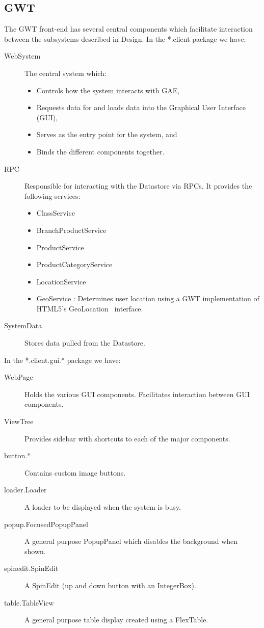 \subsection{GWT}
The GWT front-end has several central components which facilitate interaction between the subsystems described in Design.
In the *.client package we have:
\begin{description}
\item[WebSystem] The central system which:\begin{itemize}
\item Controls how the system interacts with GAE,
\item Requests data for and loads data into the Graphical User Interface (GUI),
\item Serves as the entry point for the system, and
\item Binds the different components together.
\end{itemize}  
\item[RPC] Responsible for interacting with the Datastore via RPCs. It provides the following services:  
\begin{itemize}
\item ClassService
\item BranchProductService
\item ProductService
\item ProductCategoryService
\item LocationService
\item GeoService : Determines user location using a GWT implementation of HTML5's GeoLocation~\cite{geo} interface.
\end{itemize}
 \item[SystemData] Stores data pulled from the Datastore.
\end{description}
 In the *.client.gui.* package we have:
 \begin{description}
  \item[WebPage] Holds the various GUI components. Facilitates interaction between GUI components.
  \item[ViewTree] Provides sidebar with shortcuts to each of the major components. 
  \item[button.*] Contains custom image buttons.
    \item[loader.Loader] A loader to be displayed when the system is busy.
    \item[popup.FocusedPopupPanel] A general purpose PopupPanel which disables the background when shown.
    \item[spinedit.SpinEdit] A SpinEdit (up and down button with an IntegerBox).
    \item[table.TableView] A general purpose table display created using a FlexTable.
\end{description}
